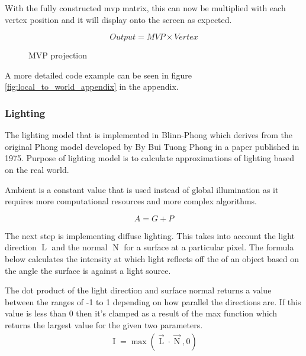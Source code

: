\documentclass[11pt]{article}
\begin{document}
With the fully constructed mvp matrix, this can now be multiplied with each
vertex position and it will display onto the screen as expected.
\begin{figure}[h!]
  \centering  
  \begin{equation}
    Output = MVP \times Vertex
  \end{equation}
  \caption{MVP projection}
  \label{fig:mvp_projection}
\end{figure}

A more detailed code example can be seen in figure
\ref{fig:local_to_world_appendix} in the appendix.

\subsubsection{Lighting}

The lighting model that is implemented in Blinn-Phong which derives
from the original Phong model developed by By Bui Tuong Phong in a
paper published in 1975.  Purpose of lighting model is to calculate
approximations of lighting based on the real world.  \cite{blinn}

Ambient is a constant value that is used instead of global illumination
as it requires more computational resources and more complex algorithms.

\newcommand{\intensity}{\operatorname{I}}
\newcommand{\lightdir}{\operatorname{L}}
\newcommand{\normal}{\operatorname{N}}
\newcommand{\diffuse}{\operatorname{D}}
\newcommand{\glslcolor}{\operatorname{C}}
\newcommand{\glslmax}{\operatorname{max}}

\begin{equation}
	A = G + P
\end{equation}

The next step is implementing diffuse lighting. This takes into account
the light direction $\lightdir$ and the normal $\normal$ for a surface at a particular
pixel. The formula below calculates the intensity at which light reflects off the
of an object based on the angle the surface is against a light source. 

The dot product of the light direction and surface normal returns a value between
the ranges of -1 to 1 depending on how parallel the directions are. If this value
is less than 0 then it's clamped as a result of the max function which returns the largest value for the given two parameters.
\begin{gather}
	\intensity = \glslmax(\vec{\lightdir} \cdot \vec{\normal}, 0) \\
\end{gather}
\end{document}

